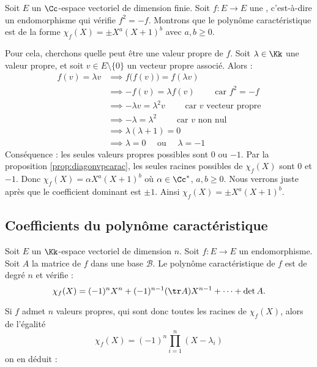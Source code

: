 \documentclass[12pt, class=report,crop=false]{standalone}
\begin{document}
\begin{exemple}
Soit $E$ un $\Cc$-espace vectoriel de dimension finie.
Soit $f : E \to E$ une , c'est-à-dire un endomorphisme qui vérifie
$f^2 = -f$. Montrons que le polynôme caractéristique est de la forme $\chi_f(X) = \pm X^a(X+1)^b$ avec $a,b \ge0$.

Pour cela, cherchons quelle peut être une valeur propre de $f$. Soit $\lambda \in \Kk$ une valeur propre, et soit $v \in E \setminus \{0\}$ un vecteur propre associé.
Alors :
\begin{align*}
       f(v) = \lambda v 
  & \implies f\big( f(v) \big)  = f(\lambda v) \\
  & \implies -f(v) = \lambda  f(v) \qquad \text{ car } f^2 = -f \\
  & \implies -\lambda v  = \lambda^2 v \qquad \text{ car $v$ vecteur propre} \\
  & \implies -\lambda = \lambda^2 \qquad \text{ car $v$ non nul } \\
  & \implies \lambda(\lambda+1) = 0 \\
  & \implies \lambda = 0 \quad \text{ ou } \quad \lambda = -1
\end{align*}
Conséquence : les seules valeurs propres possibles sont $0$ ou $-1$.
Par la proposition \ref{prop:diagonvpcarac}, les seules racines possibles de $\chi_f(X)$ sont 
$0$ et $-1$. Donc $\chi_f(X) = \alpha X^a(X+1)^b$ où $\alpha\in \Cc^*$, $a,b\ge0$. Nous verrons juste après
que le coefficient dominant est $\pm1$. Ainsi $\chi_f(X) = \pm X^a(X+1)^b$.
\end{exemple}


\subsection{Coefficients du polynôme caractéristique}



\begin{proposition}
\label{prop:polcartrdetbis}
Soit $E$ un $\Kk$-espace vectoriel de dimension $n$.
Soit $f : E \to E$ un endomorphisme. Soit $A$ la matrice de $f$ dans une base $\mathcal{B}$.
Le polynôme caractéristique de $f$ est de degré $n$ et vérifie :
$$\chi_f(X)=(-1)^n X^n + (-1)^{n-1}(\tr A)X^{n-1}+\dots+\det A.$$
\end{proposition} 


Si $f$ admet $n$ valeurs propres, qui sont donc toutes les racines de $\chi_f(X)$, alors de l'égalité
$$\chi_f(X)=(-1)^n \prod_{i=1}^n(X-\lambda_i)$$
on en déduit :
\end{document}
